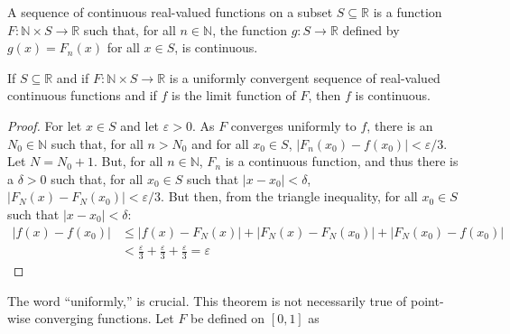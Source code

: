 \documentclass[crop=false,class=book,oneside]{standalone}
\begin{document}
            \begin{definition}
                A sequence of continuous real-valued functions
                on a subset $S\subseteq\mathbb{R}$ is a
                function
                $F:\mathbb{N}\times{S}\rightarrow\mathbb{R}$
                such that, for all $n\in\mathbb{N}$, the function
                $g:S\rightarrow\mathbb{R}$ defined by
                $g(x)=F_{n}(x)$ for all $x\in{S}$,
                is continuous.
            \end{definition}
            \begin{theorem}
                If $S\subseteq\mathbb{R}$ and if
                $F:\mathbb{N}\times{S}\rightarrow\mathbb{R}$
                is a uniformly convergent sequence of
                real-valued continuous functions and if
                ${f}$ is the limit function of $F$, then
                $f$ is continuous.
            \end{theorem}
            \begin{proof}
                For let $x\in{S}$ and let
                $\varepsilon>0$. As $F$ converges
                uniformly to $f$, there is an
                $N_{0}\in\mathbb{N}$ such that, for all
                $n>N_{0}$ and for all $x_{0}\in{S}$,
                $|F_{n}(x_{0})-f(x_{0})|<\varepsilon/3$.
                Let $N=N_{0}+1$.
                But, for all $n\in\mathbb{N}$,
                $F_{n}$ is a continuous function, and
                thus there is a $\delta>0$ such that,
                for all $x_{0}\in{S}$ such that
                $|x-x_{0}|<\delta$,
                $|F_{N}(x)-F_{N}(x_{0})|<\varepsilon/3$.
                But then, from the triangle inequality,
                for all $x_{0}\in{S}$ such that
                $|x-x_{0}|<\delta$:
                \begin{align}
                    \nonumber
                    |f(x)-f(x_{0})|&\leq
                    |f(x)-F_{N}(x)|
                    +|F_{N}(x)-F_{N}(x_{0})|
                    +|F_{N}(x_{0})-f(x_{0})|\\
                    &<\frac{\varepsilon}{3}+
                    \frac{\varepsilon}{3}+
                    \frac{\varepsilon}{3}
                    =\varepsilon
                \end{align}
            \end{proof}
            The word ``uniformly,'' is crucial.
            This theorem is not necessarily true of
            point-wise converging functions. Let $F$ be
            defined on $[0,1]$ as
\end{document}
